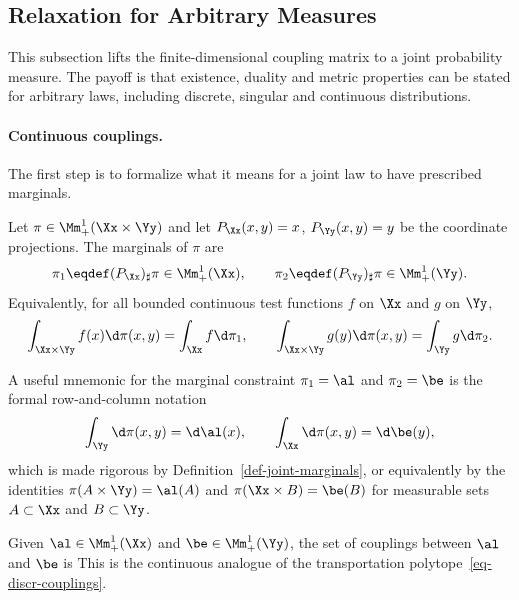\subsection{Relaxation for Arbitrary Measures}
\label{sec-kantorovich-continuous}

This subsection lifts the finite-dimensional coupling matrix to a joint probability measure. The payoff is that existence, duality and metric properties can be stated for arbitrary laws, including discrete, singular and continuous distributions.

\paragraph{Continuous couplings.}

The first step is to formalize what it means for a joint law to have prescribed marginals.

\begin{defn}\label{def-joint-marginals}
	Let $\pi\in\Mm_+^1(\Xx\times\Yy)$ and let $P_\Xx(x,y)=x$, $P_\Yy(x,y)=y$ be the coordinate projections. The marginals of $\pi$ are
	\[
		\pi_1\eqdef(P_\Xx)_\sharp\pi\in\Mm_+^1(\Xx),
		\qquad
		\pi_2\eqdef(P_\Yy)_\sharp\pi\in\Mm_+^1(\Yy).
	\]
	Equivalently, for all bounded continuous test functions $f$ on $\Xx$ and $g$ on $\Yy$,
	\[
		\int_{\Xx\times\Yy} f(x)\d\pi(x,y)=\int_\Xx f\d\pi_1,
		\qquad
		\int_{\Xx\times\Yy} g(y)\d\pi(x,y)=\int_\Yy g\d\pi_2.
	\]
\end{defn}

A useful mnemonic for the marginal constraint $\pi_1=\al$ and $\pi_2=\be$ is the formal row-and-column notation
\[
	\int_\Yy \d\pi(x,y)=\d\al(x),
	\qquad
	\int_\Xx \d\pi(x,y)=\d\be(y),
\]
which is made rigorous by Definition~\ref{def-joint-marginals}, or equivalently by the identities $\pi(A\times\Yy)=\al(A)$ and $\pi(\Xx\times B)=\be(B)$ for measurable sets $A\subset\Xx$ and $B\subset\Yy$.

\begin{defn}[Couplings]\label{def-continuous-couplings}
	Given $\al\in\Mm_+^1(\Xx)$ and $\be\in\Mm_+^1(\Yy)$, the set of couplings between $\al$ and $\be$ is
	This is the continuous analogue of the transportation polytope~\eqref{eq-discr-couplings}.
\end{defn}

